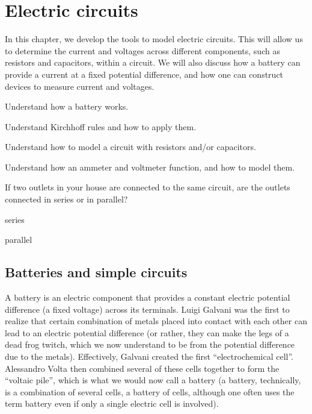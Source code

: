 \chapter{Electric circuits}
\label{chapter:circuits}
In this chapter, we develop the tools to model electric circuits. This will allow us to determine the current and voltages across different components, such as resistors and capacitors, within a circuit. We will also discuss how a battery can provide a current at a fixed potential difference, and how one can construct devices to measure current and voltages.

\begin{learningObjectives}{
 \item Understand how a battery works.
 \item Understand Kirchhoff rules and how to apply them.
 \item Understand how to model a circuit with resistors and/or capacitors.
 \item Understand how an ammeter and voltmeter function, and how to model them.
 }
\end{learningObjectives}

\begin{opening}
\begin{MCquestion}{If two outlets in your house are connected to the same circuit, are the outlets connected in series or in parallel?}
\item series
\item parallel \correct
\end{MCquestion}
\end{opening}

\section{Batteries and simple circuits}
\label{sec:circuits:batteries}
A battery is an electric component that provides a constant electric potential difference (a fixed voltage) across its terminals. Luigi Galvani was the first to realize that certain combination of metals placed into contact with each other can lead to an electric potential difference (or rather, they can make the legs of a dead frog twitch, which we now understand to be from the potential difference due to the metals). Effectively, Galvani created the first ``electrochemical cell''. Alessandro Volta then combined several of these cells together to form the ``voltaic pile'', which is what we would now call a battery (a battery, technically, is a combination of several cells, a battery of cells, although one often uses the term battery even if only a single electric cell is involved). 
